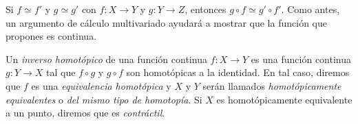 \documentclass{standalone}
\begin{document}
	\begin{exercise}\label{prop:homotopies_preserve_composition}
		Si $f\simeq f'$ y $g\simeq g'$ con $f\colon X\rightarrow Y$ y $g:Y\rightarrow Z$, entonces $g\circ f\simeq g'\circ f'$. Como antes, un argumento de cálculo multivariado ayudará a mostrar que la función que propones es continua.
	\end{exercise}
		
	
	\begin{definition}\label{defn:homotopy_equivalence}
		Un \emph{inverso homotópico} de una función continua $f:X\rightarrow Y$ es una función continua $g:Y\rightarrow X$ tal que $f\circ g$ y $g\circ f$ son homotópicas a la identidad. En tal caso, diremos que $f$ es una \emph{equivalencia homotópica} y $X$ y $Y$ serán llamados \emph{homotópicamente equivalentes} o \emph{del mismo tipo de homotopía}. Si $X$ es homotópicamente equivalente a un punto, diremos que es \emph{contráctil}.
	\end{definition}
	
\end{document}
